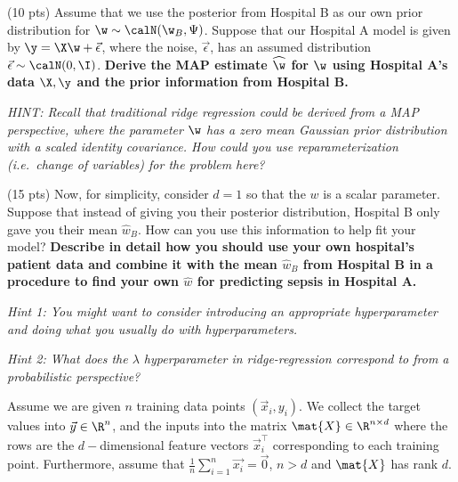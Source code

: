 \documentclass[preview]{standalone}
\begin{document}
\begin{Parts}

\Part (10 pts) Assume that we use the posterior from Hospital B as our own prior distribution for $\w \sim \calN(\w_B, \Psi)$. Suppose that our Hospital A model is given by $\y = \X \w + \vec{\epsilon}$, where the noise, $\vec{\epsilon}$, has an assumed distribution $\vec{\epsilon} \sim \calN(0, \I)$. \textbf{Derive the MAP estimate $\widehat{\w}$ for $\w$ using Hospital A's data $\X, \y$ and the prior information from Hospital B.}

{\em HINT: Recall that traditional ridge regression could be derived from a MAP perspective, where the parameter $\w$ has a zero mean Gaussian prior distribution with a scaled identity covariance. How could you use reparameterization (i.e.~change of variables) for the problem here?}



\newpage

\Part (15 pts) Now, for simplicity, consider $d=1$ so that the $w$ is a scalar parameter. Suppose that instead of giving you their posterior distribution, Hospital B only gave you their mean $\widehat{w}_B$. How can you use this information to help fit your model? \textbf{Describe in detail how you should use your own hospital's patient data and combine it with the mean $\widehat{w}_B$ from Hospital B in a procedure to find your own $\widehat{w}$ for predicting sepsis in Hospital A.}

{\em Hint 1: You might want to consider introducing an appropriate hyperparameter and doing what you usually do with hyperparameters. }

{\em Hint 2: What does the $\lambda$ hyperparameter in ridge-regression correspond to from a probabilistic perspective?}






\end{Parts}


\newcommand{\hatwPCA}{\vec{\widehat{w}}_\text{{PCA}}}
\newcommand{\hatyPCA}{\vec{\widehat{y}}_{\text{PCA}}}
\newcommand{\hatwOLS}{\vec{\widehat{w}}_{\text{OLS}}}
\newcommand{\hatwridge}{\vec{\widehat{w}}_{\text{ridge}}}
\newcommand{\tildewridge}{\vec{\tilde{w}}_{\text{ridge}}}
\newcommand{\hatyridge}{\vec{\hat{y}}_{\text{ridge}}}

Assume we are given $n$ training data points $(\vec{x}_i, y_i)$. We
collect the target values into $\vec{y} \in \R^n$, and the inputs into
the matrix $\mat{X} \in \R^{n\times d}$ where the rows are the
$d-$dimensional feature vectors $\vec x_i^\top$ corresponding to each
training point. Furthermore, assume that $\frac{1}{n}\sum_{i=1}^n
\vec{x_i} = \vec{0}$, $n > d$ and $\mat{X}$ has rank $d$.
\end{document}
